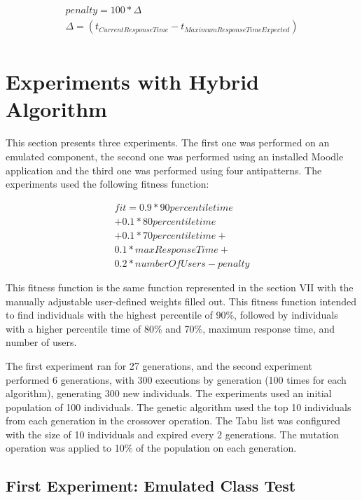 \documentclass[espaco=umemeio,chapter=TITLE,twoside,openright]{abnt}
\begin{document}
\begin{equation}
\begin{aligned}
penalty=100 * \Delta \\
\Delta=(t_{Current Response Time} - t_{Maximum Response Time Expected})\\
\end{aligned}
\end{equation}

\section{Experiments with Hybrid Algorithm}

This section presents three experiments. The first one was performed on an emulated component, the second one was performed using an installed Moodle application and the third one was performed using four antipatterns. The experiments used the following fitness function:

\begin{equation}
\begin{aligned}
fit=0.9* 90percentiletime\\
+0.1*80percentiletime\\+
0.1*70percentiletime+\\
0.1*maxResponseTime+\\
0.2*numberOfUsers-penalty
\end{aligned}
\end{equation}

This fitness function is the same function represented in the section VII with the manually adjustable user-defined weights filled out. This fitness function intended to find individuals with the highest percentile of 90\%, followed by individuals with a higher percentile time of 80\% and 70\%, maximum response time, and number of users.

The first experiment ran for 27 generations, and the second experiment  performed 6 generations, with 300 executions by generation (100 times for each algorithm),  generating 300 new individuals. The experiments used an initial population of 100 individuals. The genetic algorithm used the top 10 individuals from each generation in the crossover operation. The Tabu list was configured with the size of 10 individuals and expired every 2 generations.  The mutation operation was applied to 10\% of the population on each generation.

\subsection{First Experiment: Emulated Class Test}
\end{document}
